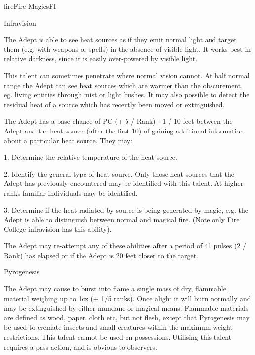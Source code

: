 \begin{College}[2.0]{fire}{Fire Magics}{FI}
\begin{talent}[T-1]{Infravision}
\begin{effects}
The Adept is able to see heat sources as if they emit normal light and
target them (e.g.  with weapons or spells) in the absence of visible
light. It works best in relative darkness, since it is easily
over-powered by visible light.

This talent can sometimes penetrate where normal vision cannot. At
half normal range the Adept can see heat sources which are warmer than
the obscurement, eg.  living entities through mist or light bushes.
It may also possible to detect the residual heat of a source which has
recently been moved or extinguished.

The Adept has a base chance of PC (+ 5 / Rank) - 1 / 10 feet between
the Adept and the heat source (after the first 10) of gaining
additional information about a particular heat source. They may:

1. Determine the relative temperature of the heat source.

2. Identify the general type of heat source.  Only those heat sources
that the Adept has previously encountered may be identified with this
talent.  At higher ranks familiar individuals may be identified.

3. Determine if the heat radiated by source is being generated by
magic, e.g.  the Adept is able to distinguish between normal and
magical fire.  (Note only Fire College infravision has this ability).

The Adept may re-attempt any of these abilities after a period of 41
pulses (2 / Rank) has elapsed or if the Adept is 20 feet closer to the
target.
\end{effects}
\end{talent}

\begin{talent}[T-2]{Pyrogenesis}

\begin{effects}
The Adept may cause to burst into flame a single mass of dry,
flammable material weighing up to 1oz (+ 1/5 ranks). Once alight it
will burn normally and may be extinguished by either mundane or
magical means.  Flammable materials are defined as wood, paper, cloth
etc, but not flesh, except that Pyrogenesis may be used to cremate
insects and small creatures within the maximum weight restrictions.
This talent cannot be used on possessions. Utilising this talent
requires a pass action, and is obvious to observers.
\end{effects}
\end{talent}


\end{College}
